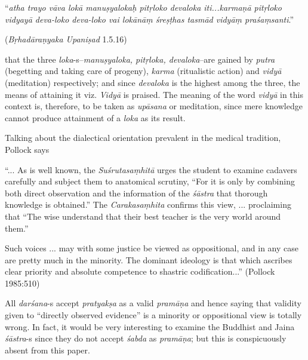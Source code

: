 \newpage

\begin{myquote}
``{\sl atha trayo vāva lokā manuṣyalokaḥ pitṛloko devaloka iti...karmaṇā pitṛloko vidyayā deva-loko deva-loko vai lokānāṃ śreṣṭhas tasmād vidyāṃ praśaṃsanti}.'' 

\hfill({\sl Bṛhadāraṇyaka Upaniṣad} 1.5.16)
\end{myquote}
that the three {\sl loka}-s--{\sl manuṣyaloka, pitṛloka, devaloka}--are gained by {\sl putra} (begetting and taking care of progeny), {\sl karma} (ritualistic action) and {\sl vidyā} (meditation) respectively; and since {\sl devaloka } is the highest among the three, the means of attaining it viz. {\sl Vidyā} is praised. The meaning of the word {\sl vidyā} in this context is, therefore, to be taken as {\sl upāsana} or meditation, since mere knowledge cannot produce attainment of a {\sl loka} as its result.

Talking about the dialectical orientation prevalent in the medical tradition, Pollock says
\begin{myquote}
``... As is well known, the {\sl Suśrutasaṃhitā} urges the student to examine cadavers carefully and subject them to anatomical scrutiny, ``For it is only by combining both direct observation and the information of the {\sl śāstra} that thorough knowledge is obtained.'' The {\sl Carakasaṃhita} conﬁrms this view, ... proclaiming that ``The wise understand that their best teacher is the very world around them.''

Such voices ... may with some justice be viewed as oppositional, and in any case are pretty much in the minority. The dominant ideology is that which ascribes clear priority and absolute competence to shastric codiﬁcation...'' (Pollock 1985:510)
\end{myquote}

All {\sl darśana}-s accept {\sl pratyakṣa} as a valid {\sl pramāṇa} and hence saying that validity given to ``directly observed evidence'' is a minority or oppositional view is totally wrong. In fact, it  would be very interesting to examine the Buddhist and Jaina {\sl śāstra}-s since they do not accept {\sl śabda} as {\sl pramāṇa}; but this is conspicuously absent from this paper.

